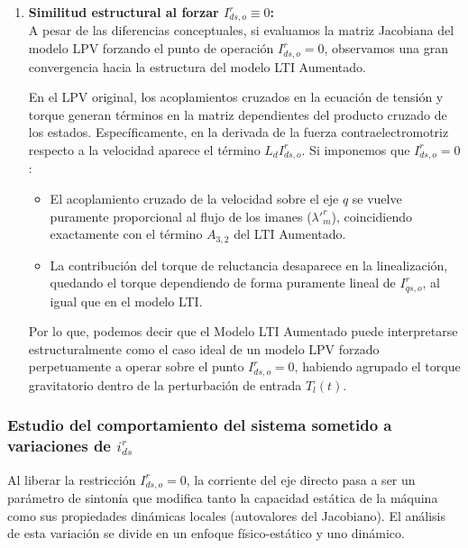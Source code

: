 \documentclass[12pt, a4paper,journal, onecolumn, compsoc]{IEEEtran}
\begin{document}
\begin{enumerate}
    \item \textbf{Similitud estructural al forzar $I^r_{ds,o} \equiv 0$:} \\
    A pesar de las diferencias conceptuales, si evaluamos la matriz Jacobiana del modelo LPV forzando el punto de operación $I^r_{ds,o} = 0$, observamos una gran convergencia hacia la estructura del modelo LTI Aumentado. 
    
    En el LPV original, los acoplamientos cruzados en la ecuación de tensión y torque generan términos en la matriz dependientes del producto cruzado de los estados. Específicamente, en la derivada de la fuerza contraelectromotriz respecto a la velocidad aparece el término $L_d I^r_{ds,o}$. Si imponemos que $I^r_{ds,o} = 0$:
    \begin{itemize}
        \item El acoplamiento cruzado de la velocidad sobre el eje $q$ se vuelve puramente proporcional al flujo de los imanes ($\lambda'^r_m$), coincidiendo exactamente con el término $A_{3,2}$ del LTI Aumentado.
        \item La contribución del torque de reluctancia desaparece en la linealización, quedando el torque dependiendo de forma puramente lineal de $I^r_{qs,o}$, al igual que en el modelo LTI.
    \end{itemize}
    
    Por lo que, podemos decir que el Modelo LTI Aumentado puede interpretarse estructuralmente como el caso ideal de un modelo LPV forzado perpetuamente a operar sobre el punto $I^r_{ds,o} = 0$, habiendo agrupado el torque gravitatorio dentro de la perturbación de entrada $T_l(t)$.
\end{enumerate}
\subsubsection{Estudio del comportamiento del sistema sometido a variaciones de $i_{ds}^r$}
Al liberar la restricción $I^r_{ds,o} = 0$, la corriente del eje directo pasa a ser un parámetro de sintonía que modifica tanto la capacidad estática de la máquina como sus propiedades dinámicas locales (autovalores del Jacobiano). El análisis de esta variación se divide en un enfoque físico-estático y uno dinámico.
\end{document}
